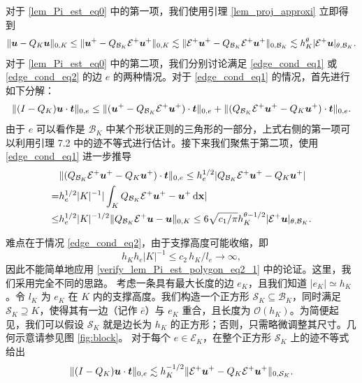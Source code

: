 对于 \eqref{lem_Pi_est_eq0} 中的第一项，我们使用引理 \ref{lem_proj_approxi} 立即得到
\begin{equation}
\label{verify_lem_Pi_est_polygon_eq1}
\| \boldsymbol{u} - Q_K \boldsymbol{u} \|_{0,K} \le \| \boldsymbol{u}^+ - Q_{\mathcal{B}_K} \mathcal{E}^+ \boldsymbol{u}^+ \|_{0,K}
\lesssim \|  \mathcal{E}^+ \boldsymbol{u}^+ - Q_{\mathcal{B}_K} \mathcal{E}^+ \boldsymbol{u}^+ \|_{0,\mathcal{B}_K}
\lesssim h^{\theta}_K |  \mathcal{E}^+ \boldsymbol{u} |_{\theta,\mathcal{B}_K}.
\end{equation}
对于 \eqref{lem_Pi_est_eq0} 中的第二项，我们分别讨论满足 \eqref{edge_cond_eq1} 或 \eqref{edge_cond_eq2} 的边 \( e \) 的两种情况。对于 \eqref{edge_cond_eq1} 的情况，首先进行如下分解：
\begin{equation}
\label{verify_lem_Pi_est_polygon_eq2}
\| (I - Q_K)\boldsymbol{u} \cdot \boldsymbol{t} \|_{0,e} \le \| (\boldsymbol{u}^+ - Q_{\mathcal{B}_K} \mathcal{E}^+ \boldsymbol{u}^+ ) \cdot \boldsymbol{t} \|_{0,e}
+ \| (Q_{\mathcal{B}_K} \mathcal{E}^+ \boldsymbol{u}^+  - Q_K\boldsymbol{u}^+) \cdot \boldsymbol{t} \|_{0,e}.
\end{equation}
由于 \( e \) 可以看作是 \( \mathcal{B}_K \)
中某个形状正则的三角形的一部分，上式右侧的第一项可以利用引理 7.2
中的迹不等式进行估计。接下来我们聚焦于第二项，使用 \eqref{edge_cond_eq1}
进一步推导
\begin{equation}
\begin{split}
\label{verify_lem_Pi_est_polygon_eq2_1}
&\| (Q_{\mathcal{B}_K} \mathcal{E}^+ \boldsymbol{u}^+  - Q_K\boldsymbol{u}^+) \cdot \boldsymbol{t} \|_{0,e}  \le h_e^{1/2} | Q_{\mathcal{B}_K} \mathcal{E}^+ \boldsymbol{u}^+  - Q_K\boldsymbol{u}^+ | \\
= & h_e^{1/2} |K|^{-1} |\int_K Q_{\mathcal{B}_K} \mathcal{E}^+ \boldsymbol{u}^+  -
\boldsymbol{u}^+ \, \mathrm{ d} \mathbf{x} | \\
\le & h_e^{1/2}|K|^{-1/2}\| Q_{\mathcal{B}_K} \mathcal{E}^+ \boldsymbol{u}  - \boldsymbol{u} \|_{0,K}
\le 6 \sqrt{c_1/\pi} h^{\theta-1/2}_K | \mathcal{E}^+ \boldsymbol{u} |_{\theta,\mathcal{B}_K}.
\end{split}
\end{equation}

难点在于情况 \eqref{edge_cond_eq2}，由于支撑高度可能收缩，即
$$
h_K h_e |K|^{-1} \le c_2 \, h_K/l_e \rightarrow \infty,
$$
因此不能简单地应用 \eqref{verify_lem_Pi_est_polygon_eq2_1} 中的论证。这里，我们采用完全不同的思路。
考虑一条具有最大长度的边 $e_K$，且我们知道 $|e_K|\simeq h_K$。令 $l_K$ 为 $e_K$ 在 $K$ 内的支撑高度。我们构造一个正方形 $\mathcal{S}_K\subseteq \mathcal{B}_K$，同时满足 $\mathcal{S}_K\supseteq K$，使得其有一边（记作 $\bar{e}$）与 $e_K$ 重合，且长度为 $\mathcal{O}(h_K)$。为简便起见，我们可以假设 $\mathcal{S}_K$ 就是边长为 $h_K$ 的正方形；否则，只需略微调整其尺寸。几何示意请参见图 \ref{fig:block}。
对于每个 $e\in\mathcal{E}_K$，在整个正方形 $\mathcal{S}_K$ 上的迹不等式给出
\begin{equation}
\label{verify_lem_Pi_est_polygon_eq3}
\| (I - Q_K)\boldsymbol{u} \cdot \boldsymbol{t} \|_{0,e} \lesssim h^{-1/2}_K \| \mathcal{E}^+ \boldsymbol{u}^+ - Q_{K} \mathcal{E}^+ \boldsymbol{u}^+ \|_{0,\mathcal{S}_K}.
\end{equation}

